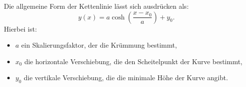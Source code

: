 Die allgemeine Form der Kettenlinie lässt sich ausdrücken als:
\begin{equation}
	y(x)
	=
	a \cosh\left(\frac{x - x_0}{a}\right) + y_0.
\end{equation}
Hierbei ist:

\begin{itemize}
	\item \(a\) ein Skalierungsfaktor, der die Krümmung bestimmt,
	\item \(x_0\) die horizontale Verschiebung, die den Scheitelpunkt der Kurve bestimmt,
	\item \(y_0\) die vertikale Verschiebung, die die minimale Höhe der Kurve angibt.
\end{itemize}
